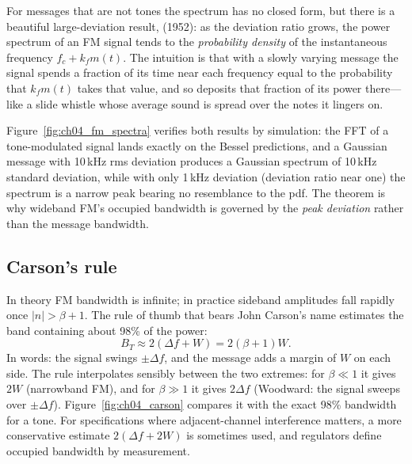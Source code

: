 For messages that are not tones the spectrum has no closed form, but there is a beautiful large-deviation
result,  (1952): as the deviation ratio grows, the power spectrum of an FM signal
tends to the \emph{probability density} of the instantaneous frequency $f_c+k_fm(t)$. The intuition is
that with a slowly varying message the signal spends a fraction of its time near each frequency equal to
the probability that $k_fm(t)$ takes that value, and so deposits that fraction of its power there---like a
slide whistle whose average sound is spread over the notes it lingers on.

Figure~\ref{fig:ch04_fm_spectra} verifies both results by simulation: the FFT of a tone-modulated signal
lands exactly on the Bessel predictions, and a Gaussian message with 10\,kHz rms deviation produces a
Gaussian spectrum of 10\,kHz standard deviation, while with only 1\,kHz deviation (deviation ratio near
one) the spectrum is a narrow peak bearing no resemblance to the pdf. The theorem is why wideband FM's
occupied bandwidth is governed by the \emph{peak deviation} rather than the message bandwidth.


\subsection{Carson's rule}

In theory FM bandwidth is infinite; in practice sideband amplitudes fall rapidly once $|n|>\beta+1$. The
rule of thumb that bears John Carson's name estimates the band containing about 98\% of the power:
\begin{equation}
B_T\approx 2(\Delta f+W)=2(\beta+1)W.
\label{eq:ch04:carson}
\end{equation}
In words: the signal swings $\pm\Delta f$, and the message adds a margin of $W$ on each side. The rule
interpolates sensibly between the two extremes: for $\beta\ll1$ it gives $2W$ (narrowband FM), and for
$\beta\gg1$ it gives $2\Delta f$ (Woodward: the signal sweeps over $\pm\Delta f$).
Figure~\ref{fig:ch04_carson} compares it with the exact 98\% bandwidth for a tone. For specifications where
adjacent-channel interference matters, a more conservative estimate $2(\Delta f+2W)$ is sometimes used, and
regulators define occupied bandwidth by measurement.


